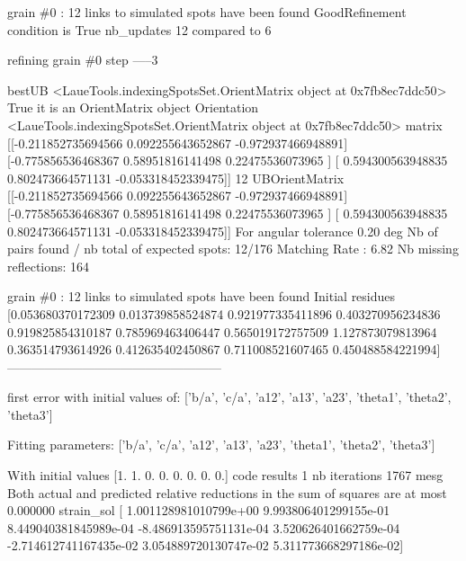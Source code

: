 \documentclass[letterpaper,10pt,english]{sphinxmanual}
\begin{document}
\begin{sphinxalltt}
grain \#0 : 12 links to simulated spots have been found
GoodRefinement condition is  True
nb\_updates 12 compared to 6


 refining grain \#0 step -----3

bestUB \textless{}LaueTools.indexingSpotsSet.OrientMatrix object at 0x7fb8ec7ddc50\textgreater{}
True it is an OrientMatrix object
Orientation \textless{}LaueTools.indexingSpotsSet.OrientMatrix object at 0x7fb8ec7ddc50\textgreater{}
matrix {[}{[}-0.211852735694566  0.092255643652867 -0.972937466948891{]}
 {[}-0.775856536468367  0.58951816141498   0.22475536073965 {]}
 {[} 0.594300563948835  0.802473664571131 -0.053318452339475{]}{]}
 12
UBOrientMatrix {[}{[}-0.211852735694566  0.092255643652867 -0.972937466948891{]}
 {[}-0.775856536468367  0.58951816141498   0.22475536073965 {]}
 {[} 0.594300563948835  0.802473664571131 -0.053318452339475{]}{]}
For angular tolerance 0.20 deg
Nb of pairs found / nb total of expected spots: 12/176
Matching Rate : 6.82
Nb missing reflections: 164

grain \#0 : 12 links to simulated spots have been found
Initial residues {[}0.053680370172309 0.013739858524874 0.921977335411896 0.403270956234836
 0.919825854310187 0.785969463406447 0.565019172757509 1.127873079813964
 0.363514793614926 0.412635402450867 0.711008521607465 0.450488584221994{]}
---------------------------------------------------



\sphinxstylestrong{***********************}
first error with initial values of: {[}'b/a', 'c/a', 'a12', 'a13', 'a23', 'theta1', 'theta2', 'theta3'{]}

\sphinxstylestrong{***********************}



\sphinxstylestrong{***********************}
Fitting parameters:   {[}'b/a', 'c/a', 'a12', 'a13', 'a23', 'theta1', 'theta2', 'theta3'{]}

\sphinxstylestrong{***********************}

With initial values {[}1. 1. 0. 0. 0. 0. 0. 0.{]}
code results 1
nb iterations 1767
mesg Both actual and predicted relative reductions in the sum of squares
  are at most 0.000000
strain\_sol {[} 1.001128981010799e+00  9.993806401299155e-01  8.449040381845989e-04
 -8.486913595751131e-04  3.520626401662759e-04 -2.714612741167435e-02
  3.054889720130747e-02  5.311773668297186e-02{]}



\end{sphinxalltt}
\end{document}
